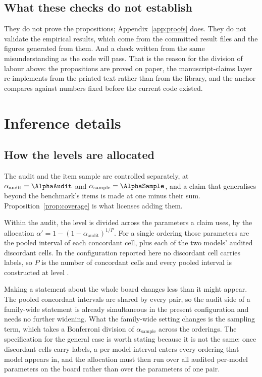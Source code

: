 \subsection{What these checks do not establish}

They do not prove the propositions; Appendix~\ref{app:proofs} does. They do not validate the
empirical results, which come from the committed result files and the figures generated from
them. And a check written from the same misunderstanding as the code will pass. That is the
reason for the division of labour above: the propositions are proved on paper, the
manuscript-claims layer re-implements from the printed text rather than from the library, and
the anchor compares against numbers fixed before the current code existed.

\section{Inference details}
\label{app:inference}

\subsection{How the levels are allocated}

The audit and the item sample are controlled separately, at $\alpha_{\mathrm{audit}} =
\AlphaAudit$ and $\alpha_{\mathrm{sample}} = \AlphaSample$, and a claim that generalises
beyond the benchmark's items is made at one minus their sum. Proposition~\ref{prop:coverage}
is what licenses adding them.

Within the audit, the level is divided across the parameters a claim uses, by the allocation
$\alpha' = 1 - (1-\alpha_{\mathrm{audit}})^{1/P}$. For a single ordering those parameters are
the pooled interval of each concordant cell, plus each of the two models' audited discordant
cells. In the configuration reported here no discordant cell carries labels, so $P$ is the
number of concordant cells and every pooled interval is constructed at level
\SidakTwoLevel{}.

Making a statement about the whole board changes less than it might appear. The pooled
concordant intervals are shared by every pair, so the audit side of a family-wide statement is
already simultaneous in the present configuration and needs no further widening. What the
family-wide setting changes is the sampling term, which takes a Bonferroni division of
$\alpha_{\mathrm{sample}}$ across the \NumOrderings{} orderings. The specification for the
general case is worth stating because it is not the same: once discordant cells carry labels,
a per-model interval enters every ordering that model appears in, and the allocation must then
run over all audited per-model parameters on the board rather than over the parameters of one
pair.

